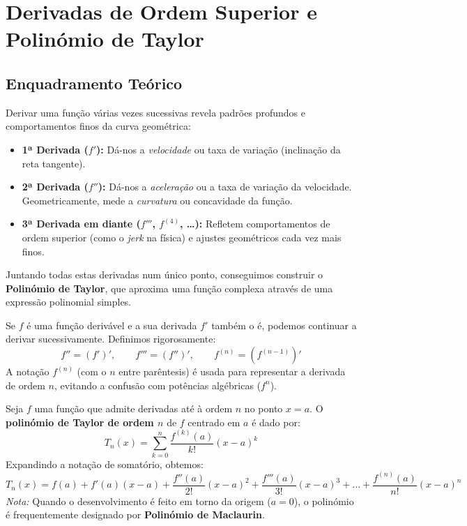 
\section{Derivadas de Ordem Superior e Polinómio de Taylor}

\subsection{Enquadramento Teórico}

\begin{notebox}[title={Intuição Geral}]
  Derivar uma função várias vezes sucessivas revela padrões profundos e comportamentos finos da curva geométrica:
  \begin{itemize}
      \item \textbf{1ª Derivada ($f'$):} Dá-nos a \emph{velocidade} ou taxa de variação (inclinação da reta tangente).
      \item \textbf{2ª Derivada ($f''$):} Dá-nos a \emph{aceleração} ou a taxa de variação da velocidade. Geometricamente, mede a \emph{curvatura} ou concavidade da função.
      \item \textbf{3ª Derivada em diante ($f'''$, $f^{(4)}$, \dots):} Refletem comportamentos de ordem superior (como o \emph{jerk} na física) e ajustes geométricos cada vez mais finos.
  \end{itemize}
  Juntando todas estas derivadas num único ponto, conseguimos construir o \textbf{Polinómio de Taylor}, que aproxima uma função complexa através de uma expressão polinomial simples.
\end{notebox}

\begin{defbox}[title={Derivadas Sucessivas}]
  Se $f$ é uma função derivável e a sua derivada $f'$ também o é, podemos continuar a derivar sucessivamente. Definimos rigorosamente:
  \[
    f'' = (f')', \qquad f''' = (f'')', \qquad f^{(n)} = \left(f^{(n-1)}\right)'
  \]
  A notação $f^{(n)}$ (com o $n$ entre parêntesis) é usada para representar a derivada de ordem $n$, evitando a confusão com potências algébricas ($f^n$).
\end{defbox}

\begin{defbox}[title={Polinómio de Taylor}]
  Seja $f$ uma função que admite derivadas até à ordem $n$ no ponto $x=a$. O \textbf{polinómio de Taylor de ordem $n$} de $f$ centrado em $a$ é dado por:
  \[
    T_n(x) = \sum_{k=0}^n \frac{f^{(k)}(a)}{k!}(x-a)^k
  \]
  Expandindo a notação de somatório, obtemos:
  \[
    T_n(x) = f(a) + f'(a)(x-a) + \frac{f''(a)}{2!}(x-a)^2 + \frac{f'''(a)}{3!}(x-a)^3 + \dots + \frac{f^{(n)}(a)}{n!}(x-a)^n
  \]
  \textit{Nota:} Quando o desenvolvimento é feito em torno da origem ($a=0$), o polinómio é frequentemente designado por \textbf{Polinómio de Maclaurin}.
\end{defbox}

